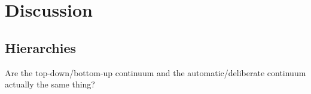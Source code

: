 \chapter{Discussion}


\section{Hierarchies}




Are the top-down/bottom-up continuum and the automatic/deliberate continuum actually the same thing?
